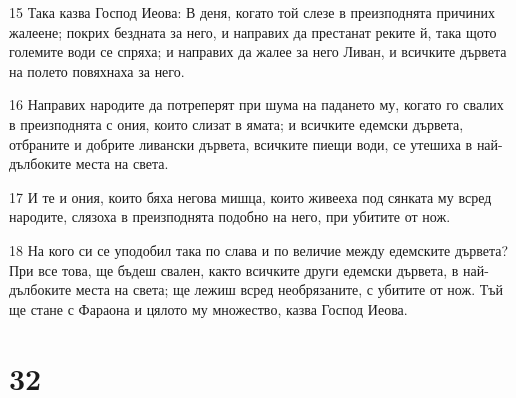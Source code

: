 \par 15 Така казва Господ Иеова: В деня, когато той слезе в преизподнята причиних жалеене; покрих бездната за него, и направих да престанат реките й, така щото големите води се спряха; и направих да жалее за него Ливан, и всичките дървета на полето повяхнаха за него.
\par 16 Направих народите да потреперят при шума на падането му, когато го свалих в преизподнята с ония, които слизат в ямата; и всичките едемски дървета, отбраните и добрите ливански дървета, всичките пиещи води, се утешиха в най-дълбоките места на света.
\par 17 И те и ония, които бяха негова мишца, които живееха под сянката му всред народите, слязоха в преизподнята подобно на него, при убитите от нож.
\par 18 На кого си се уподобил така по слава и по величие между едемските дървета? При все това, ще бъдеш свален, както всичките други едемски дървета, в най-дълбоките места на света; ще лежиш всред необрязаните, с убитите от нож. Тъй ще стане с Фараона и цялото му множество, казва Господ Иеова.

\chapter{32}


